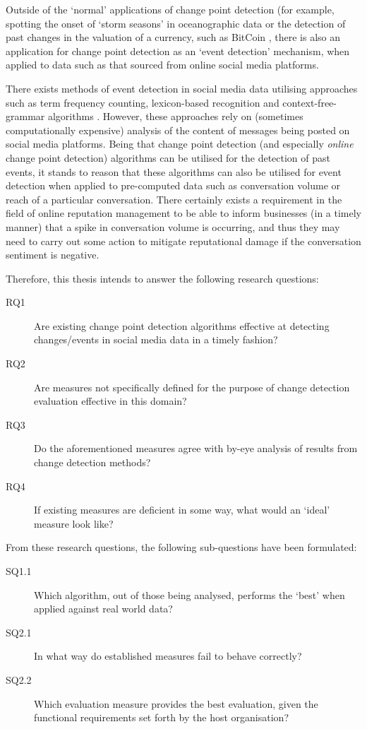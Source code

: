 \documentclass{uvamscse}	%
\begin{document}
Outside of the `normal' applications of change point detection (for example, spotting the onset of `storm seasons' in oceanographic data \cite{Killick2011} or the detection of past changes in the valuation of a currency, such as BitCoin \cite{Buntain2014}, there is also an application for change point detection as an `event detection' mechanism, when applied to data such as that sourced from online social media platforms.

There exists methods of event detection in social media data utilising approaches such as term frequency counting, lexicon-based recognition and context-free-grammar algorithms . However, these approaches rely on (sometimes computationally expensive) analysis of the content of messages being posted on social media platforms. Being that change point detection (and especially \emph{online} change point detection) algorithms can be utilised for the detection of past events, it stands to reason that these algorithms can also be utilised for event detection when applied to pre-computed data such as conversation volume or reach of a particular conversation. There certainly exists a requirement in the field of online reputation management to be able to inform businesses (in a timely manner) that a spike in conversation volume is occurring, and thus they may need to carry out some action to mitigate reputational damage if the conversation sentiment is negative.

Therefore, this thesis intends to answer the following research questions:

\begin{description}
	\item[RQ1] Are existing change point detection algorithms effective at detecting changes/events in social media data in a timely fashion?
	\item[RQ2] Are measures not specifically defined for the purpose of change detection evaluation effective in this domain?
	\item[RQ3] Do the aforementioned measures agree with by-eye analysis of results from change detection methods?
	\item[RQ4] If existing measures are deficient in some way, what would an `ideal' measure look like?
\end{description}

From these research questions, the following sub-questions have been formulated:

\begin{description}
    \item[SQ1.1] Which algorithm, out of those being analysed, performs the `best' when applied against real world data?
    \item[SQ2.1] In what way do established measures fail to behave correctly?
    \item[SQ2.2] Which evaluation measure provides the best evaluation, given the functional requirements set forth by the host organisation?
\end{description}
\end{document}
